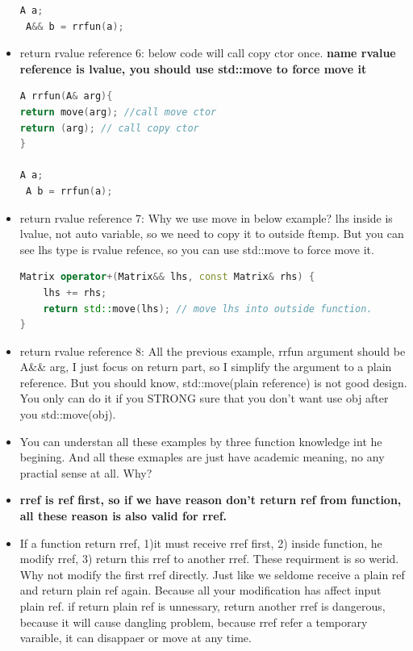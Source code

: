 \documentclass[a4paper,12pt,twoside]{book}
\begin{document}
\begin{itemize}
\begin{lstlisting}[frame=single, language=c++]
 A a;
 A&& b = rrfun(a);
\end{lstlisting}

\item return rvalue reference 6:   below code will call copy ctor once. \textbf{name rvalue reference is lvalue, you should use std::move to force move it}
\begin{lstlisting}[frame=single, language=c++]
A rrfun(A& arg){
return move(arg); //call move ctor 
return (arg); // call copy ctor
}

A a;
 A b = rrfun(a);
\end{lstlisting}

\item return rvalue reference 7: Why we use move in below example? lhs inside is lvalue, not auto variable,  so we need to copy it to outside ftemp. But you can see lhs type is rvalue refence, so you can use std::move to force move it.
\begin{lstlisting}[frame=single, language=c++]
Matrix operator+(Matrix&& lhs, const Matrix& rhs) {
    lhs += rhs;
    return std::move(lhs); // move lhs into outside function.
}
\end{lstlisting}

\item return rvalue reference 8: All the previous example, rrfun argument should be A\&\& arg,  I just focus on return part, so I simplify the argument to a plain reference. But you should know, std::move(plain reference) is not good design. You only can do it if you STRONG sure that you don't want use obj after you std::move(obj).

\item You can understan all these examples by three function knowledge int he begining. And all these exmaples are just have academic meaning, no any practial sense at all. Why?

\item \textbf{rref is ref first, so if we have reason don't return ref from function, all these reason is also valid for rref.}

\item If a function return rref, 1)it must receive rref first,  2) inside function, he modify rref, 3) return this rref to another rref. These requirment is so werid. Why not modify the first rref directly. Just like we seldome receive a plain ref and return plain ref again. Because all your modification has affect input plain ref.  if return plain ref is unnessary, return another rref is dangerous, because it will cause dangling problem, because rref refer a temporary varaible, it can disappaer or move at any time.


\end{itemize}
\end{document}

